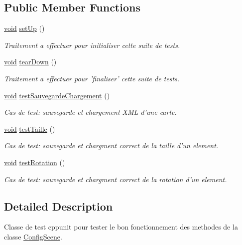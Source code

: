 \subsection*{Public Member Functions}
\begin{DoxyCompactItemize}
\item 
\hyperlink{wglew_8h_aeea6e3dfae3acf232096f57d2d57f084}{void} \hyperlink{group__inf2990_ga707d7400843047e67b736ab79bafb5a0}{set\-Up} ()
\begin{DoxyCompactList}\small\item\em Traitement a effectuer pour initialiser cette suite de tests. \end{DoxyCompactList}\item 
\hyperlink{wglew_8h_aeea6e3dfae3acf232096f57d2d57f084}{void} \hyperlink{group__inf2990_ga889ed3891c3e55280cabb982953906d9}{tear\-Down} ()
\begin{DoxyCompactList}\small\item\em Traitement a effectuer pour 'finaliser' cette suite de tests. \end{DoxyCompactList}\item 
\hyperlink{wglew_8h_aeea6e3dfae3acf232096f57d2d57f084}{void} \hyperlink{group__inf2990_ga0f09d52bc30d87f18b0341e1052efb74}{test\-Sauvegarde\-Chargement} ()
\begin{DoxyCompactList}\small\item\em Cas de test\-: sauvegarde et chargement X\-M\-L d'une carte. \end{DoxyCompactList}\item 
\hyperlink{wglew_8h_aeea6e3dfae3acf232096f57d2d57f084}{void} \hyperlink{group__inf2990_gac6b0ce9867809f3caab1e8f0a3d1a54a}{test\-Taille} ()
\begin{DoxyCompactList}\small\item\em Cas de test\-: sauvegarde et chargment correct de la taille d'un element. \end{DoxyCompactList}\item 
\hyperlink{wglew_8h_aeea6e3dfae3acf232096f57d2d57f084}{void} \hyperlink{group__inf2990_gab62faa9bff39bff7feb25dffda78c21a}{test\-Rotation} ()
\begin{DoxyCompactList}\small\item\em Cas de test\-: sauvegarde et chargment correct de la rotation d'un element. \end{DoxyCompactList}\end{DoxyCompactItemize}


\subsection{Detailed Description}
Classe de test cppunit pour tester le bon fonctionnement des methodes de la classe \hyperlink{class_config_scene}{Config\-Scene}. 

